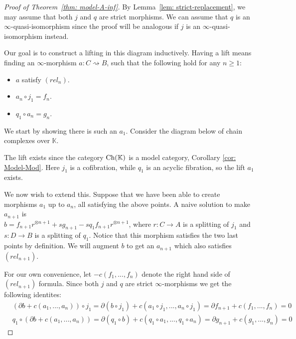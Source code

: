 \documentclass[../thesis.tex]{subfiles}
\begin{document}
\begin{proof}[Proof of Theorem~\ref{thm: model-A-inf}]
            By Lemma~\ref{lem: strict-replacement}, we may assume that both $j$ and $q$ are strict morphisms. We can assume that $q$ is an $\infty$-quasi-isomorphism since the proof will be analogous if $j$ is an $\infty$-quasi-isomorphism instead.

            Our goal is to construct a lifting in this diagram inductively. Having a lift means finding an $\infty$-morphism $a : C \rightsquigarrow B$, such that the following hold for any $n\geq 1$:
            \begin{itemize}
                \item $a$ satisfy $(rel_n)$.
                \item $a_n \circ j_1 = f_n$.
                \item $q_1\circ a_n = g_n$.
            \end{itemize}

            We start by showing there is such an $a_1$. Consider the diagram below of chain complexes over $\mathbb{K}$.
            \begin{center}
            \end{center}
            The lift exists since the category $\tt{Ch}(\mathbb{K})$ is a model category, Corollary \ref{cor: Model-Mod}. Here $j_1$ is a cofibration, while $q_1$ is an acyclic fibration, so the lift $a_1$ exists.

            We now wish to extend this. Suppose that we have been able to create morphisms $a_1$ up to $a_n$, all satisfying the above points. A naive solution to make $a_{n+1}$ is \\ $b = f_{n+1}r^{\otimes n+1} + sg_{n+1} - s q_1f_{n+1}r^{\otimes n+1}$, where $r : C \rightarrow A$ is a splitting of $j_1$ and $s : D \rightarrow B$ is a splitting of $q_1$. Notice that this morphism satisfies the two last points by definition. We will augment $b$ to get an $a_{n+1}$ which also satisfies $(rel_{n+1})$.

            For our own convenience, let $-c(f_1, ..., f_n)$ denote the right hand side of $(rel_{n+1})$ formula. Since both $j$ and $q$ are strict $\infty$-morphisms we get the following identites:
            \begin{align*}
                & (\partial b + c(a_1, ..., a_n)) \circ j_1 = \partial (b\circ j_1) + c(a_1 \circ j_1, ..., a_n \circ j_1) = \partial f_{n+1} + c(f_1, ..., f_n) = 0 \\
                & q_1 \circ (\partial b + c(a_1, ..., a_n)) = \partial (q_1\circ b) + c(q_1\circ a_1, ..., q_1\circ a_n) = \partial {g_{n+1}} + c(g_1, ..., g_n) = 0
            \end{align*}


\end{proof}
\end{document}
